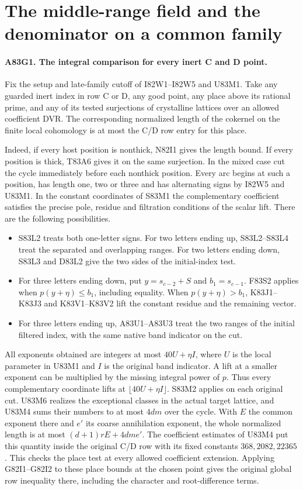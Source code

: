 \section{The middle-range field and the denominator on a common family}

\paragraph{A83G1. The integral comparison for every inert C and D point.}
Fix the setup and late-family cutoff of I82W1--I82W5 and U83M1.
Take any guarded inert index in row C or D, any good point, any
place above its rational prime, and any of its tested surjections
of crystalline lattices over an allowed coefficient DVR.
The corresponding normalized length of the cokernel on the finite
local cohomology is at most the C/D row entry for this place.

Indeed, if every host position is nonthick, N82I1 gives the
length bound. If every position is thick, T83A6 gives it on the
same surjection. In the mixed case cut the cycle immediately
before each nonthick position. Every arc begins at such a position,
has length one, two or three and has alternating signs by I82W5
and U83M1. In the constant coordinates of S83M1 the complementary
coefficient satisfies the precise pole, residue and filtration
conditions of the scalar lift. There are the following possibilities.
\begin{itemize}
\item S83L2 treats both one-letter signs. For two letters ending
up, S83L2--S83L4 treat the separated and overlapping ranges.
For two letters ending down, S83L3 and D83L2 give the two sides
of the initial-index test.
\item For three letters ending down, put $y=s_{c-2}+S$ and
$b_1=s_{c-1}$. F83S2 applies when $p(y+\eta)\le b_1$,
including equality. When $p(y+\eta)>b_1$, K83J1--K83J3 and
K83V1--K83V2 lift the constant residue and the remaining vector.
\item For three letters ending up, A83U1--A83U3 treat the
two ranges of the initial filtered index, with the same native
band indicator on the cut.
\end{itemize}
All exponents obtained are integers at most $40U+\eta I$, where
$U$ is the local parameter in U83M1 and $I$ is the original band
indicator. A lift at a smaller exponent can be multiplied by
the missing integral power of $p$. Thus every complementary
coordinate lifts at $\lfloor40U+\eta I\rfloor$.
S83M2 applies on each original cut. U83M6 realizes the exceptional
classes in the actual target lattice, and U83M4 sums their
numbers to at most $4dm$ over the cycle. With $E$ the common
exponent there and $e'$ its coarse annihilation exponent, the
whole normalized length is at most $(d+1)rE+4dm e'$. The
coefficient estimates of U83M4 put this quantity inside the
original C/D row with its fixed constants $368,2082,22365$.
This checks the place test at every allowed coefficient extension.
Applying G82I1--G82I2 to these place bounds at the chosen point
gives the original global row inequality there, including the
character and root-difference terms.

